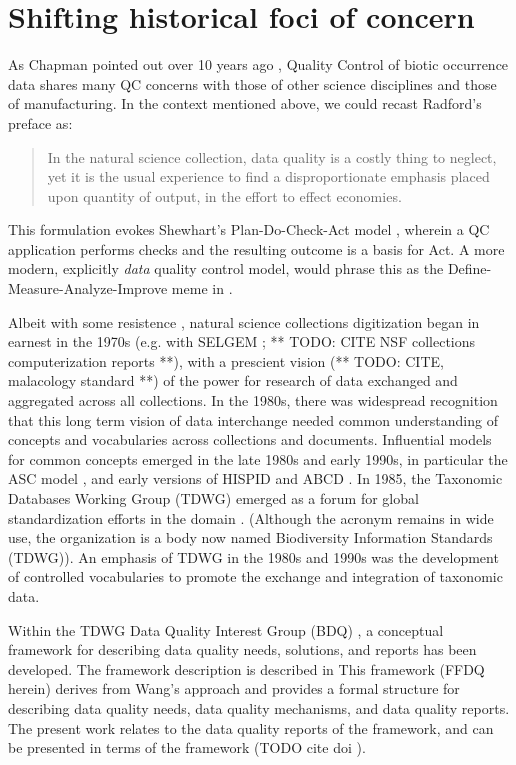 \documentclass{article}
\begin{document}
  \section{Shifting historical foci of concern}
As Chapman pointed out over 10 years ago \citep{chapman_principles_2005}, Quality Control of biotic occurrence data shares many QC concerns with those of other science disciplines and those of manufacturing. 
In the context mentioned above, we could recast Radford's preface as:
\begin{quotation}
  In the natural science collection, data quality is a costly thing to neglect, yet it is the usual experience to find a disproportionate emphasis placed upon quantity of output, in the effort to effect economies.
\end{quotation}

  This formulation evokes Shewhart's Plan-Do-Check-Act model \citep{shewhart_statistical_1939}, wherein a QC application performs checks and the resulting outcome is a basis for Act. A more modern, explicitly {\em data} quality control model, would phrase this as the Define-Measure-Analyze-Improve meme in \citep{Wang1998}.  


  Albeit with some resistence \citep{ShetlerDemyth1974}, natural science collections digitization began in earnest in the 1970s (e.g. with SELGEM \citep{SELGEM1971}; ** TODO: CITE NSF collections computerization reports **), with a prescient vision (** TODO: CITE, malacology standard **) of the power for research of data exchanged and aggregated across all collections.  In the 1980s, there was widespread recognition that this long term vision of data interchange needed common understanding of concepts and vocabularies across collections and documents.  Influential models for common concepts emerged in the late 1980s and early 1990s, in particular the ASC model \citep{ASC1992}, and early versions of HISPID \citep{HISPID5} and ABCD \citep{ABCD2015}.  In 1985, the Taxonomic Databases Working Group (TDWG) emerged as a forum for global standardization efforts in the domain \citep{tdwg_tdwg_2007}. (Although the acronym remains in wide use, the organization is a body now named Biodiversity Information Standards (TDWG)).  An emphasis of TDWG in the 1980s and 1990s was the development of controlled vocabularies to promote the exchange and integration of taxonomic data.
  
Within the TDWG Data Quality Interest Group (BDQ) 
\cite{BDQ}, 
a conceptual framework for describing data quality needs, solutions, and reports has been developed. The framework description is described in  
\cite{10.1371/journal.pone.0178731}   This framework (FFDQ herein) derives from Wang's approach and provides a formal structure for describing data quality needs, data quality mechanisms, and data quality reports.  The present work relates to the data quality reports of the framework, and can be presented in terms of the framework (TODO cite doi ).
\end{document}
